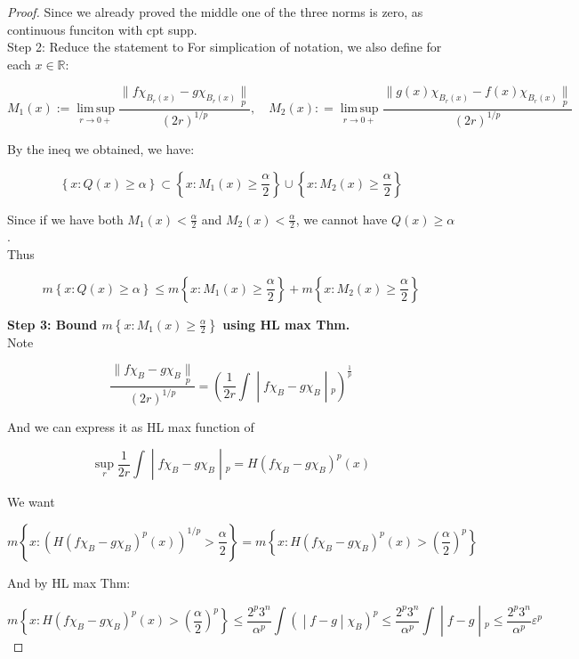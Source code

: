 \begin{proof}
Since we already proved the middle one of the three norms is zero, as continuous funciton with cpt supp.\\
Step 2: Reduce the statement to For simplication of notation, we also define for each \(x \in \mathbb{R}\):

\[M_{1}(x) := \operatorname{lim\, sup}\limits_{r\rightarrow 0 +}\frac{\parallel f\chi_{B_{r}(x)} - g\chi_{B_{r}(x)}\underset{p}{\parallel}}{(2r)^{1/p}},\quad M_{2}(x): = \operatorname{lim\, sup}\limits_{r\rightarrow 0 +}\frac{\parallel g(x)\chi_{B_{r}(x)} - f(x)\chi_{B_{r}(x)}\underset{p}{\parallel}}{(2r)^{1/p}}\]

By the ineq we obtained, we have:

\[\left\{ {x:Q(x) \geq \alpha} \right\} \subset \left\{ {x:M_{1}(x) \geq \frac{\alpha}{2}} \right\} \cup \left\{ {x:M_{2}(x) \geq \frac{\alpha}{2}} \right\}\]

Since if we have both \(M_{1}(x) < \frac{\alpha}{2}\) and \(M_{2}(x) < \frac{\alpha}{2}\), we cannot have \(Q(x) \geq \alpha\).\\
Thus

\[m\left\{ {x:Q(x) \geq \alpha} \right\} \leq m\left\{ {x:M_{1}(x) \geq \frac{\alpha}{2}} \right\} + m\left\{ {x:M_{2}(x) \geq \frac{\alpha}{2}} \right\}\]

\textbf{Step 3: Bound \(m\left\{ {x:M_{1}(x) \geq \frac{\alpha}{2}} \right\}\) using HL max Thm.}\\
Note

\[\left. \frac{\parallel f\chi_{B} - g\chi_{B}\underset{p}{\parallel}}{(2r)^{1/p}} = (\frac{1}{2r}\int \middle| f\chi_{B} - g\chi_{B} \middle| {}_{p})^{\frac{1}{p}} \right.\]

And we can express it as HL max function of

\[\left. \sup\limits_{r}\frac{1}{2r}\int \middle| f\chi_{B} - g\chi_{B} \middle| {}_{p} = H(f\chi_{B} - g\chi_{B})^{p}(x) \right.\]

We want

\[m\left\{ {x:(H(f\chi_{B} - g\chi_{B})^{p}(x))^{1/p} > \frac{\alpha}{2}} \right\} = m\left\{ {x:H(f\chi_{B} - g\chi_{B})^{p}(x) > (\frac{\alpha}{2})^{p}} \right\}\]

And by HL max Thm:

\[\left. m\left\{ {x:H(f\chi_{B} - g\chi_{B})^{p}(x) > (\frac{\alpha}{2})^{p}} \right\} \leq \frac{2^{p}3^{n}}{\alpha^{p}}\int( \middle| f - g \middle| \chi_{B})^{p} \leq \frac{2^{p}3^{n}}{\alpha^{p}}\int \middle| f - g \middle| {}_{p} \leq \frac{2^{p}3^{n}}{\alpha^{p}}\varepsilon^{p} \right.\]


\end{proof}
